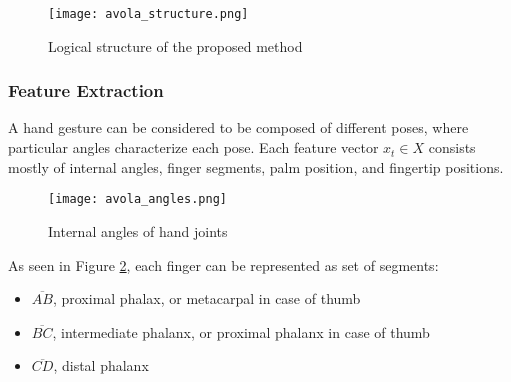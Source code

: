\begin{figure}[ht]
	\centering
    \texttt{[image: avola\_structure.png]}
	\caption{Logical structure of the proposed method \cite{avola}}
	\label{fig:lstm_gesture_structure}
\end{figure}

\subsubsection{Feature Extraction}
\label{sec:feature_extraction}

A hand gesture can be considered to be composed of different poses, where particular angles characterize each pose. Each feature vector $x_t \in X$ consists mostly of internal angles, finger segments, palm position, and fingertip positions.

\begin{figure}[ht]
	\centering
    \texttt{[image: avola\_angles.png]}
	\caption{Internal angles of hand joints \cite{avola}}
	\label{fig:lstm_angles}
\end{figure}

As seen in Figure \ref{fig:lstm_angles}, each finger can be represented as set of segments:
\begin{itemize}
	\item $\overline{AB}$, proximal phalax, or metacarpal in case of thumb
	\item $\overline{BC}$, intermediate phalanx, or proximal phalanx in case of thumb
	\item $\overline{CD}$, distal phalanx
\end{itemize}

